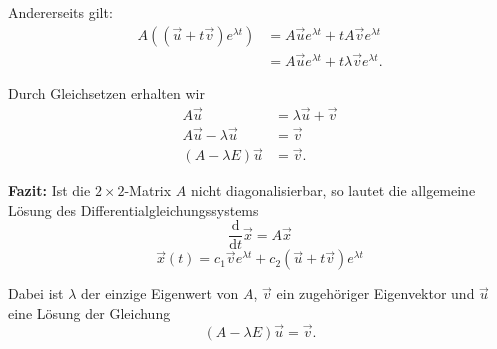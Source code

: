 \begin{enumerate}
\begin{enumerate}
                    Andererseits gilt:
                    \[
                        \begin{aligned}
                            A\left((\vec{u}+t\vec{v})e^{\lambda t}\right)
                             & = A\vec{u}e^{\lambda t}
                            +tA\vec{v}e^{\lambda t}    \\
                             & = A\vec{u}e^{\lambda t}
                            +t\lambda\vec{v}e^{\lambda t}.
                        \end{aligned}
                    \]

                    Durch Gleichsetzen erhalten wir
                    \[
                        \begin{aligned}
                            A\vec{u}                & = \lambda\vec{u}+\vec{v} \\
                            A\vec{u}-\lambda\vec{u} & = \vec{v}                \\
                            (A-\lambda E)\vec{u}    & = \vec{v}.
                        \end{aligned}
                    \]

                    \textbf{Fazit:} Ist die \(2\times 2\)-Matrix \(A\)
                    nicht diagonalisierbar, so lautet die allgemeine Lösung
                    des Differentialgleichungssystems
                    \[
                        \frac{\mathrm{d}}{\mathrm{d}t}\vec{x}=A\vec{x}
                    \]
                    \[
                        \boxed{
                            \vec{x}(t)
                            = c_1\vec{v}e^{\lambda t}
                            + c_2(\vec{u}+t\vec{v})e^{\lambda t}
                        }
                    \]

                    Dabei ist \(\lambda\) der einzige Eigenwert von \(A\),
                    \(\vec{v}\) ein zugehöriger Eigenvektor und
                    \(\vec{u}\) eine Lösung der Gleichung
                    \[
                        (A-\lambda E)\vec{u}=\vec{v}.
                    \]
          \end{enumerate}
\end{enumerate}


